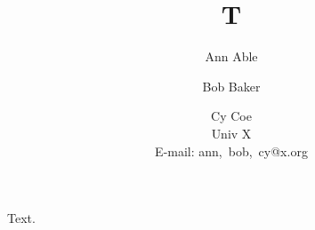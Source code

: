 \documentclass{article}
\title{T}\author{Ann Able \and Bob Baker \and Cy Coe\\ Univ X\\ E-mail: ann,~bob,~cy@x.org}
\begin{document}
\maketitle
Text.
\end{document}

